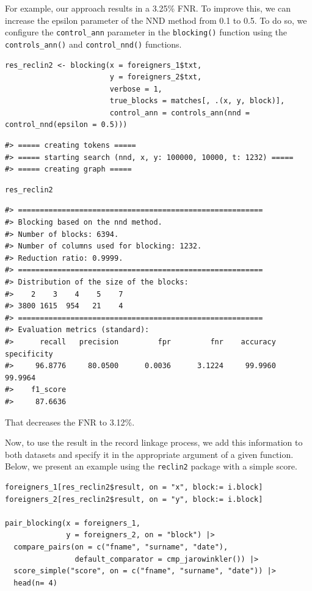 For example, our approach results in a
3.25\% FNR. To improve this,
we can increase the epsilon parameter of the NND method from 0.1 to 0.5.
To do so, we configure the \texttt{control\_ann} parameter in the \texttt{blocking()}
function using the \texttt{controls\_ann()} and \texttt{control\_nnd()} functions.

\begin{verbatim}
res_reclin2 <- blocking(x = foreigners_1$txt,
                        y = foreigners_2$txt,
                        verbose = 1,
                        true_blocks = matches[, .(x, y, block)],
                        control_ann = controls_ann(nnd = control_nnd(epsilon = 0.5)))
\end{verbatim}

\begin{verbatim}
#> ===== creating tokens =====
#> ===== starting search (nnd, x, y: 100000, 10000, t: 1232) =====
#> ===== creating graph =====
\end{verbatim}

\begin{verbatim}
res_reclin2
\end{verbatim}

\begin{verbatim}
#> ========================================================
#> Blocking based on the nnd method.
#> Number of blocks: 6394.
#> Number of columns used for blocking: 1232.
#> Reduction ratio: 0.9999.
#> ========================================================
#> Distribution of the size of the blocks:
#>    2    3    4    5    7 
#> 3800 1615  954   21    4 
#> ========================================================
#> Evaluation metrics (standard):
#>      recall   precision         fpr         fnr    accuracy specificity 
#>     96.8776     80.0500      0.0036      3.1224     99.9960     99.9964 
#>    f1_score 
#>     87.6636
\end{verbatim}

That decreases the FNR to
3.12\%.

Now, to use the result in the record linkage process, we add this
information to both datasets and specify it in the appropriate argument
of a given function. Below, we present an example using the \texttt{reclin2}
package with a simple score.

\begin{verbatim}
foreigners_1[res_reclin2$result, on = "x", block:= i.block]
foreigners_2[res_reclin2$result, on = "y", block:= i.block]

pair_blocking(x = foreigners_1, 
              y = foreigners_2, on = "block") |>
  compare_pairs(on = c("fname", "surname", "date"),
                default_comparator = cmp_jarowinkler()) |>
  score_simple("score", on = c("fname", "surname", "date")) |>
  head(n= 4)
\end{verbatim}

